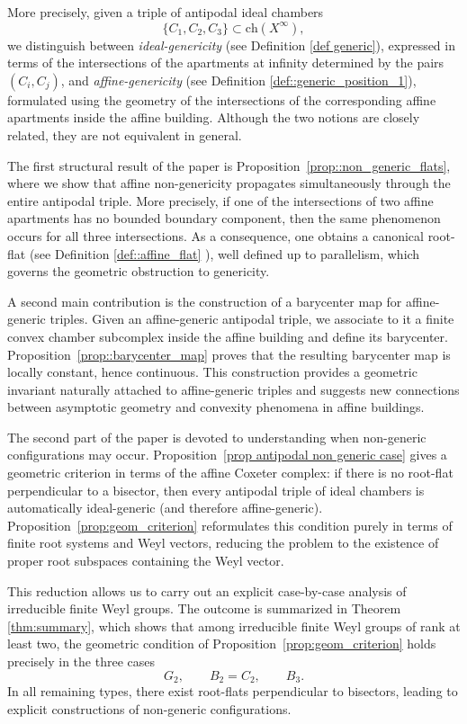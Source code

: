 \documentclass[11pt]{amsart}
\theoremstyle{plain}
\theoremstyle{definition}
\theoremstyle{remark}
\begin{document}
	
	More precisely, given a triple of antipodal ideal chambers
	\[
	\{C_1,C_2,C_3\}\subset \mathrm{ch}(X^\infty),
	\]
	we distinguish between \emph{ideal-genericity} (see Definition \ref{def generic}), expressed in terms of the intersections of the apartments at infinity determined by the pairs $(C_i,C_j)$, and \emph{affine-genericity} (see Definition \ref{def::generic_position_1}), formulated using the geometry of the intersections of the corresponding affine apartments inside the affine building. Although the two notions are closely related, they are not equivalent in general.
	
	The first structural result of the paper is Proposition~\ref{prop::non_generic_flats}, where we show that affine non-genericity propagates simultaneously through the entire antipodal triple. More precisely, if one of the intersections of two affine apartments has no bounded boundary component, then the same phenomenon occurs for all three intersections. As a consequence, one obtains a canonical root-flat (see Definition \ref{def::affine_flat} ), well defined up to parallelism, which governs the geometric obstruction to genericity.
	
	A second main contribution is the construction of a barycenter map for affine-generic triples. Given an affine-generic antipodal triple, we associate to it a finite convex chamber subcomplex inside the affine building and define its barycenter. Proposition~\ref{prop::barycenter_map} proves that the resulting barycenter map is locally constant, hence continuous. This construction provides a geometric invariant naturally attached to affine-generic triples and suggests new connections between asymptotic geometry and convexity phenomena in affine buildings.
	
	The second part of the paper is devoted to understanding when non-generic configurations may occur. Proposition~\ref{prop antipodal non generic case}  gives a geometric criterion in terms of the affine Coxeter complex: if there is no root-flat perpendicular to a bisector, then every antipodal triple of ideal chambers is automatically ideal-generic (and therefore affine-generic). Proposition~\ref{prop:geom_criterion}
	reformulates this condition purely in terms of finite root systems and Weyl vectors, reducing the problem to the existence of proper root subspaces containing the Weyl vector.
	
	This reduction allows us to carry out an explicit case-by-case analysis of irreducible finite Weyl groups. The outcome is summarized in Theorem~ \ref{thm:summary}, which shows that among irreducible finite Weyl groups of rank at least two, the geometric condition of Proposition~\ref{prop:geom_criterion} holds precisely in the three cases
	\[
	G_2,\qquad B_2=C_2,\qquad B_3.
	\]
	In all remaining types, there exist root-flats perpendicular to bisectors, leading to explicit constructions of non-generic configurations.
	
\end{document}
